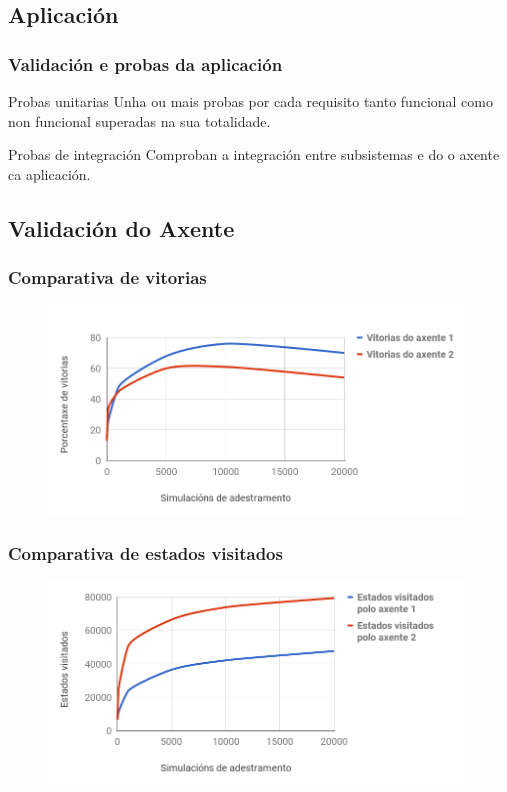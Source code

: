 \documentclass{beamer}
\begin{document}
\subsection{Aplicación}
\begin{frame}
\frametitle{Validación e probas da aplicación}
\begin{block}{Probas unitarias}
	Unha ou mais probas por cada requisito tanto funcional como non funcional superadas na sua totalidade.
\end{block}

\begin{block}{Probas de integración}
	Comproban a integración entre subsistemas e do o axente ca aplicación.
\end{block}
\note{

}
\end{frame}
\subsection{Validación do Axente}
\begin{frame}
\frametitle{Comparativa de vitorias}

\begin{figure}[h]
	\centerline{\includegraphics[width=11cm]{./graficos/vitorias.png}}
	\label{graf:victorias}
\end{figure}
\note{

}
\end{frame}

\begin{frame}
\frametitle{Comparativa de estados visitados}
\begin{figure}[h]
	\centerline{\includegraphics[width=11cm]{./graficos/estados.png}}
	\label{graf:estados}
\end{figure}

\note{

}
\end{frame}
\end{document}
